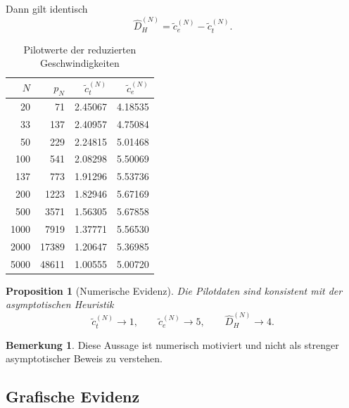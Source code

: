 \documentclass[a4paper,12pt]{article}
\newtheorem{proposition}[satz]{Proposition}
\theoremstyle{definition}
\newtheorem{bemerkung}[satz]{Bemerkung}
\numberwithin{equation}{section}
\begin{document}
	Dann gilt identisch
	\[
	\widehat D_H^{(N)}=\tilde c_e^{(N)}-\tilde c_t^{(N)}.
	\]
	
	\begin{table}[htbp]
		\centering
		\caption{Pilotwerte der reduzierten Geschwindigkeiten}
		\begin{tabular}{@{}rrrr@{}}
			\toprule
			\(N\) & \(p_N\) & \(\tilde c_t^{(N)}\) & \(\tilde c_e^{(N)}\) \\
			\midrule
			20   & 71    & 2.45067 & 4.18535 \\
			33   & 137   & 2.40957 & 4.75084 \\
			50   & 229   & 2.24815 & 5.01468 \\
			100  & 541   & 2.08298 & 5.50069 \\
			137  & 773   & 1.91296 & 5.53736 \\
			200  & 1223  & 1.82946 & 5.67169 \\
			500  & 3571  & 1.56305 & 5.67858 \\
			1000 & 7919  & 1.37771 & 5.56530 \\
			2000 & 17389 & 1.20647 & 5.36985 \\
			5000 & 48611 & 1.00555 & 5.00720 \\
			\bottomrule
		\end{tabular}
	\end{table}
	
	\begin{proposition}[Numerische Evidenz]
		Die Pilotdaten sind konsistent mit der asymptotischen Heuristik
		\[
		\tilde c_t^{(N)}\to 1,
		\qquad
		\tilde c_e^{(N)}\to 5,
		\qquad
		\widehat D_H^{(N)}\to 4.
		\]
	\end{proposition}
	
	\begin{bemerkung}
		Diese Aussage ist numerisch motiviert und nicht als strenger asymptotischer Beweis zu verstehen.
	\end{bemerkung}
	
	\subsection{Grafische Evidenz}
	
\end{document}
